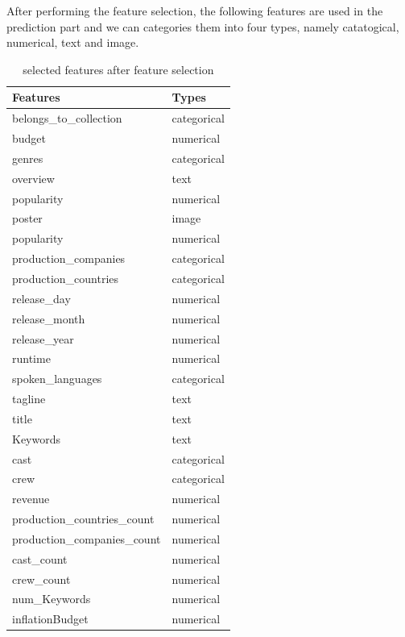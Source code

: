 \documentclass{article}
\begin{document}
After performing the feature selection, the following features  are used in the prediction part and we can categories them into four types, namely catatogical, numerical, text and image.

\begin{table}[htb]
	\caption{selected features after feature selection}
	\label{sample-table}
	\centering
	\begin{tabular}{ll}
		\toprule
		\cmidrule{1-2}
		Features &  Types \\
		\midrule
		belongs\_to\_collection & categorical \\
		budget & numerical \\
		genres & categorical \\
		overview & text \\
		popularity & numerical \\
		poster & image  \\
		popularity & numerical  \\
		production\_companies  & categorical \\
		production\_countries   & categorical\\
		release\_day  & numerical \\
		release\_month  & numerical \\
		release\_year   & numerical\\
		runtime  & numerical \\
		spoken\_languages & categorical\\
		tagline & text \\
		title & text \\
		Keywords & text \\
		cast & categorical\\
		crew & categorical\\
		revenue  & numerical \\
		production\_countries\_count & numerical\\
		production\_companies\_count & numerical\\
		cast\_count & numerical\\
		crew\_count & numerical\\
		num\_Keywords & numerical\\
		inflationBudget & numerical\\
		\midrule
	\end{tabular}
\end{table}



		

\pagebreak
\end{document}
